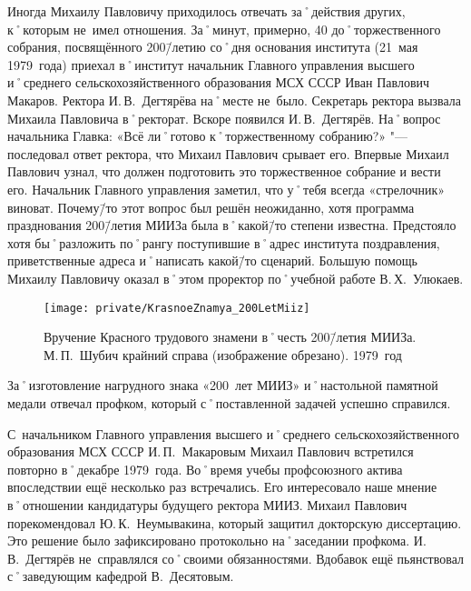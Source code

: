 Иногда Михаилу Павловичу приходилось отвечать за˚действия других, к˚которым не~имел отношения. За˚минут, примерно, 40 до˚торжественного собрания, посвящённого 200\=/летию со˚дня основания института (21~мая 1979~года) приехал в˚институт начальник Главного управления высшего и˚среднего сельскохозяйственного образования МСХ СССР Иван Павлович Макаров. Ректора И.\,В.~Дегтярёва на˚месте не~было. Секретарь ректора вызвала Михаила Павловича в˚ректорат. Вскоре появился И.\,В.~Дегтярёв. На˚вопрос начальника Главка: «Всё ли˚готово к˚торжественному собранию?» "--- последовал ответ ректора, что Михаил Павлович срывает его. Впервые Михаил Павлович узнал, что должен подготовить это торжественное собрание и вести его. Начальник Главного управления заметил, что у˚тебя всегда «стрелочник» виноват. Почему\=/то этот вопрос был решён неожиданно, хотя программа празднования 200\=/летия МИИЗа была в˚какой\=/то степени известна. Предстояло хотя бы˚разложить по˚рангу поступившие в˚адрес института поздравления, приветственные адреса и˚написать какой\=/то сценарий. Большую помощь Михаилу Павловичу оказал в˚этом проректор по˚учебной работе В.\,Х.~Улюкаев.

\begin{figure}[h]
\texttt{[image: private/KrasnoeZnamya\_200LetMiiz]}
\caption[Вручение Красного трудового знамени в˚честь 200\=/летия МИИЗа. М.\,П.~Шубич крайний справа (изображение обрезано). 1979~год]{Вручение Красного трудового знамени в˚честь 200\=/летия МИИЗа. М.\,П.~Шубич крайний справа (изображение обрезано). 1979~год\footnotemark}
\label{fig:KrasnoeZnamya_200LetMiiz}
\end{figure}

За˚изготовление нагрудного знака «200~лет МИИЗ» и˚настольной памятной медали отвечал профком, который с˚поставленной задачей успешно справился.

С~начальником Главного управления высшего и˚среднего сельскохозяйственного образования МСХ СССР И.\,П.~Макаровым Михаил Павлович встретился повторно в˚декабре 1979~года. Во˚время учебы профсоюзного актива впоследствии ещё несколько раз встречались. Его интересовало наше мнение в˚отношении кандидатуры будущего ректора МИИЗ. Михаил Павлович порекомендовал Ю.\,К.~Неумывакина, который защитил докторскую диссертацию. Это решение было зафиксировано протокольно на˚заседании профкома. И.\,В.~Дегтярёв не~справлялся со˚своими обязанностями. Вдобавок ещё пьянствовал с˚заведующим кафедрой В.~Десятовым.

